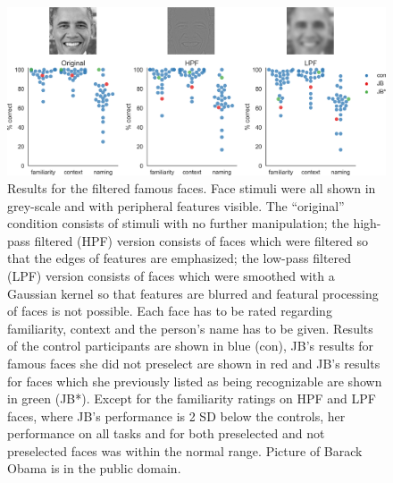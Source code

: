 \documentclass[fleqn,10pt]{SelfArx} %
\begin{document}
 \begin{figure}[htbp]
 	\begin{minipage}{\textwidth}
 		\renewcommand{\familydefault}{\sfdefault}\normalfont
 		\centering
 		\includegraphics[width=\columnwidth]{../reports/figures/filterface_main_figure_mod.png}
 		\vspace*{-3mm}
 		\caption{Results for the filtered famous faces. Face stimuli were all shown in grey-scale and with peripheral features visible. The “original” condition consists of stimuli with no further manipulation; the high-pass filtered (HPF) version consists of faces which were filtered so that the edges of features are emphasized; the low-pass filtered (LPF) version consists of faces which were smoothed with a Gaussian kernel so that features are blurred and featural processing of faces is not possible. Each face has to be rated regarding familiarity, context and the person's name has to be given. Results of the control participants are shown in blue (con), JB's results for famous faces she did not preselect are shown in red and JB's results for faces which she previously listed as being recognizable are shown in green (JB*). Except for the familiarity ratings on HPF and LPF faces, where JB's performance is 2 SD below the controls, her performance on all tasks and for both preselected and not preselected faces was within the normal range. Picture of Barack Obama is in the public domain.}%
 		\label{fig:filtered}
 	\end{minipage}
 \end{figure}
 
\end{document}

